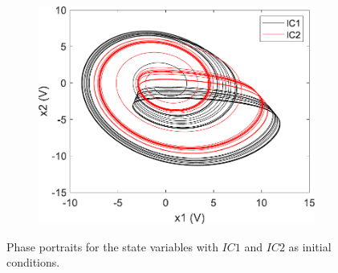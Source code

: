 \begin{figure}
        \begin{subfigure}[b]{0.3\textwidth}   
            \centering 
            \includegraphics[scale=0.35]{figs/x2vsx1Valid.pdf}
        \end{subfigure}
        \caption{Phase portraits for the state variables with $IC1$ and $IC2$ as initial conditions.}
        \label{fig:validPhase}
	\end{figure}

